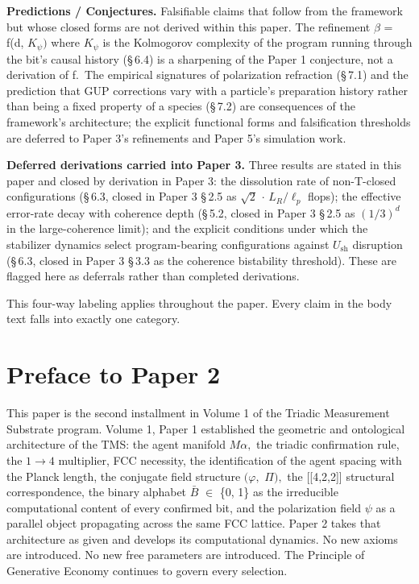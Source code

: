 \documentclass[11pt,oneside]{report}
\theoremstyle{definition}
\theoremstyle{remark}
\begin{document}
\textbf{Predictions / Conjectures.} Falsifiable claims that follow from
the framework but whose closed forms are not derived within this paper.
The refinement \ensuremath{\beta} = f(d, \ensuremath{K_{\psi})} where \ensuremath{K_{\psi}} is the Kolmogorov complexity of
the program running through the bit's causal history (\S\,6.4) is a
sharpening of the Paper 1 conjecture, not a derivation of f.~The
empirical signatures of polarization refraction (\S\,7.1) and the
prediction that GUP corrections vary with a particle's preparation
history rather than being a fixed property of a species (\S\,7.2) are
consequences of the framework's architecture; the explicit functional
forms and falsification thresholds are deferred to Paper 3's refinements
and Paper 5's simulation work.

\textbf{Deferred derivations carried into Paper 3.} Three results are
stated in this paper and closed by derivation in Paper 3: the
dissolution rate of non-T-closed configurations (\S\,6.3, closed in Paper 3
\S\,2.5 as \ensuremath{\sqrt{2}} \ensuremath{\cdot} \ensuremath{L_{R}/\ell_{p}} flops); the effective error-rate decay with
coherence depth (\S\,5.2, closed in Paper 3 \S\,2.5 as \ensuremath{(1/3)^{d}} in the
large-coherence limit); and the explicit conditions under which the
stabilizer dynamics select program-bearing configurations against \ensuremath{U_{\mathrm{sh}}}
disruption (\S\,6.3, closed in Paper 3 \S\,3.3 as the coherence bistability
threshold). These are flagged here as deferrals rather than completed
derivations.

This four-way labeling applies throughout the paper. Every claim in the
body text falls into exactly one category.

\section*{Preface to Paper 2}

This paper is the second installment in Volume 1 of the Triadic
Measurement Substrate program. Volume 1, Paper 1 established the
geometric and ontological architecture of the TMS: the agent manifold
\ensuremath{M\alpha ,} the triadic confirmation rule, the \ensuremath{1\to 4} multiplier, FCC necessity,
the identification of the agent spacing with the Planck length, the
conjugate field structure \ensuremath{(\varphi ,} \ensuremath{\Pi ),} the [[4,2,2]] structural
correspondence, the binary alphabet \ensuremath{\bar{B}} \ensuremath{\in} \{0, 1\} as the irreducible
computational content of every confirmed bit, and the polarization field
\ensuremath{\psi} as a parallel object propagating across the same FCC lattice. Paper 2
takes that architecture as given and develops its computational
dynamics. No new axioms are introduced. No new free parameters are
introduced. The Principle of Generative Economy continues to govern
every selection.
\end{document}
